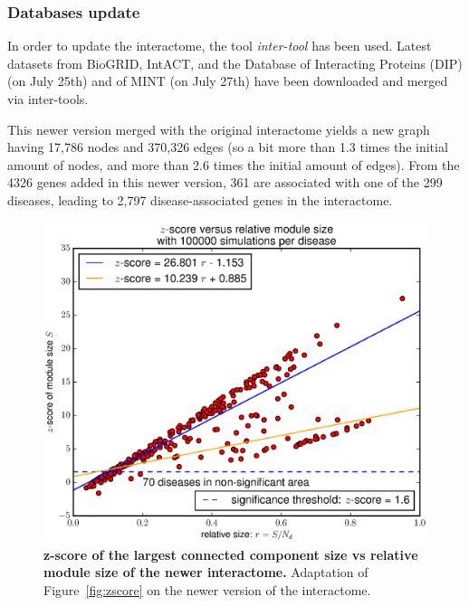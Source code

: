 \documentclass[letterpaper]{article}
\begin{document}
		\subsubsection{Databases update}
		In order to update the interactome, the tool \textit{inter-tool} \citep{inter-tools} has been used.
		Latest datasets from BioGRID, IntACT, and the Database of Interacting Proteins (DIP) \citep{salwinski2004DIP}
		(on July 25th) and of MINT (on July 27th) have been downloaded and merged via inter-tools.

		This newer version merged with the original interactome yields a new graph having 17,786 nodes and 370,326 edges
		(so a bit more than 1.3 times the initial amount of nodes, and more than 2.6 times the initial amount of edges).
		From the 4326 genes added in this newer version, 361 are associated with one of the 299 diseases, leading to 2,797
		disease-associated genes in the interactome.


		\begin{figure}[!h]
			\includegraphics[width=.5\textwidth]{images/new_interactome_S4.b100000.eps}
			\caption{{\bf z-score of the largest connected component size vs relative module size of the newer interactome.}
			Adaptation of Figure~\ref{fig:zscore} on the newer version of the interactome.
			\label{fig:new interactome zscore}}
		\end{figure}
\end{document}
